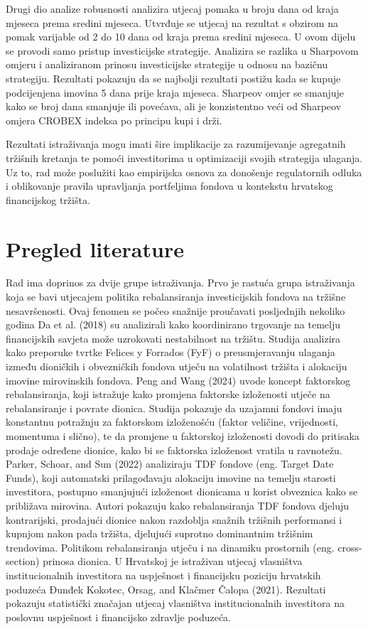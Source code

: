 \documentclass[
  letterpaper,
  DIV=11,
  numbers=noendperiod]{scrartcl}
\begin{document}
Drugi dio analize robusnosti analizira utjecaj pomaka u broju dana od
kraja mjeseca prema sredini mjeseca. Utvrđuje se utjecaj na rezultat s
obzirom na pomak varijable od 2 do 10 dana od kraja prema sredini
mjeseca. U ovom dijelu se provodi samo pristup investicijske strategije.
Analizira se razlika u Sharpovom omjeru i analiziranom prinosu
investicijske strategije u odnosu na bazičnu strategiju. Rezultati
pokazuju da se najbolji rezultati postižu kada se kupuje podcijenjena
imovina 5 dana prije kraja mjeseca. Sharpeov omjer se smanjuje kako se
broj dana smanjuje ili povećava, ali je konzistentno veći od Sharpeov
omjera CROBEX indeksa po principu kupi i drži.

Rezultati istraživanja mogu imati šire implikacije za razumijevanje
agregatnih tržišnih kretanja te pomoći investitorima u optimizaciji
svojih strategija ulaganja. Uz to, rad može poslužiti kao empirijska
osnova za donošenje regulatornih odluka i oblikovanje pravila
upravljanja portfeljima fondova u kontekstu hrvatskog financijskog
tržišta.

\section{Pregled literature}\label{pregled-literature}

Rad ima doprinos za dvije grupe istraživanja. Prvo je rastuća grupa
istraživanja koja se bavi utjecajem politika rebalansiranja
investicijskih fondova na tržišne nesavršenosti. Ovaj fenomen se počeo
snažnije proučavati posljednjih nekoliko godina Da et al. (2018) su
analizirali kako koordinirano trgovanje na temelju financijskih savjeta
može uzrokovati nestabilnost na tržištu. Studija analizira kako
preporuke tvrtke Felices y Forrados (FyF) o preusmjeravanju ulaganja
između dioničkih i obvezničkih fondova utječu na volatilnost tržišta i
alokaciju imovine mirovinskih fondova. Peng and Wang (2024) uvode
koncept faktorskog rebalansiranja, koji istražuje kako promjena
faktorske izloženosti utječe na rebalansiranje i povrate dionica.
Studija pokazuje da uzajamni fondovi imaju konstantnu potražnju za
faktorskom izloženošću (faktor veličine, vrijednosti, momentuma i
slično), te da promjene u faktorskoj izloženosti dovodi do pritisaka
prodaje određene dionice, kako bi se faktorska izloženost vratila u
ravnotežu. Parker, Schoar, and Sun (2022) analiziraju TDF fondove (eng.
Target Date Funds), koji automatski prilagođavaju alokaciju imovine na
temelju starosti investitora, postupno smanjujući izloženost dionicama u
korist obveznica kako se približava mirovina. Autori pokazuju kako
rebalansiranja TDF fondova djeluju kontrarijski, prodajući dionice nakon
razdoblja snažnih tržišnih performansi i kupnjom nakon pada tržišta,
djelujući suprotno dominantnim tržišnim trendovima. Politikom
rebalansiranja utječu i na dinamiku prostornih (eng. cross-section)
prinosa dionica. U Hrvatskoj je istraživan utjecaj vlasništva
institucionalnih investitora na uspješnost i financijsku poziciju
hrvatskih poduzeća Đunđek Kokotec, Orsag, and Klačmer Čalopa (2021).
Rezultati pokazuju statistički značajan utjecaj vlasništva
institucionalnih investitora na poslovnu uspješnost i financijsko
zdravlje poduzeća.
\end{document}
